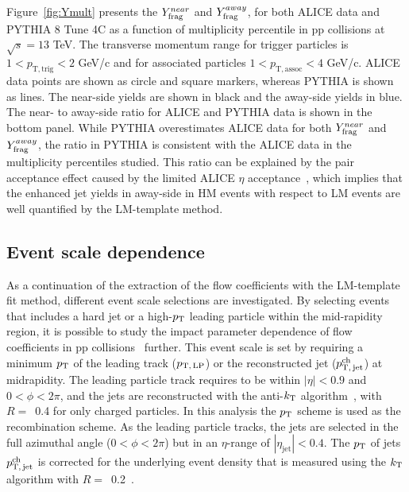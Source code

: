 Figure~\ref{fig:Ymult} presents the $Y^{near}_{\rm{frag}}$ and $Y^{away}_{\rm{frag}}$, for both ALICE data and PYTHIA 8 Tune 4C as a function of multiplicity percentile in pp collisions at $\sqrt{s}=13$ TeV. The transverse momentum range for trigger particles is $1<p_\mathrm{T,trig}<2$ GeV/c and for associated particles $1<p_\mathrm{T,assoc}<4$ GeV/c. ALICE data points are shown as circle and square markers, whereas PYTHIA is shown as lines. The near-side yields are shown in black and the away-side yields in blue.
The near- to away-side ratio for ALICE and PYTHIA data is shown in the bottom panel. While PYTHIA overestimates ALICE data for both $Y^{near}_{\rm{frag}}$ and $Y^{away}_{\rm{frag}}$, the ratio in PYTHIA is consistent with the ALICE data in the multiplicity percentiles studied. This ratio can be explained by the pair acceptance effect caused by the limited ALICE $\eta$ acceptance~\cite{PHENIX:2006gto}, which implies that the enhanced jet yields in away-side in HM events with respect to LM events are well quantified by the LM-template method.

\subsection{Event scale dependence}
As a continuation of the extraction of the flow coefficients with the LM-template fit method, different event scale selections are investigated. By selecting events that includes a hard jet or a high-$p_\mathrm{T}$ leading particle within the mid-rapidity region, it is possible to study the impact parameter dependence of flow coefficients in pp collisions~\cite{Sjostrand:1986ep,Frankfurt:2010ea} further. This event scale is set by requiring a minimum $p_\mathrm{T}$ of the leading track ($p_\mathrm{T,\,LP}$) or the reconstructed jet ($p_\mathrm{T,\,jet}^\mathrm{ch}$) at midrapidity. The leading particle track requires to be within $|\eta|<0.9$ and $0<\phi<2\pi$, and the jets are reconstructed with the anti-$k_{\rm{T}}$ algorithm~\cite{Cacciari:2008gp,Cacciari:2011ma}, with $R=$~0.4 for only charged particles. In this analysis the $p_\mathrm{T}$ scheme is used as the recombination scheme. As the leading particle tracks, the jets are selected in the full azimuthal angle ($0<\phi<2\pi$) but in an $\eta$-range of $|\eta_\mathrm{jet}|<0.4$. The $p_\mathrm{T}$ of jets $p_\mathrm{T,\,jet}^\mathrm{ch}$ is corrected for the underlying event density that is measured using the $k_{\rm{T}}$ algorithm with $R=$~0.2~\cite{Acharya:2018eat}.





